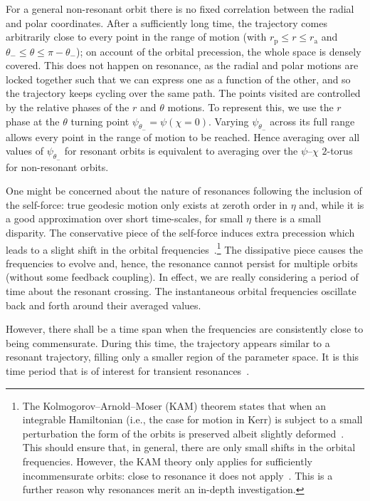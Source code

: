 \documentclass[aps,prd,amsfonts,amssymb,amsmath,nofootinbib,showpacs,superscriptaddress,twocolumn]{revtex4}
\newcommand{\sub}[1]{\ensuremath{_\text{#1}}}
\begin{document}
For a general non-resonant orbit there is no fixed correlation between the radial and polar coordinates. After a sufficiently long time, the trajectory comes arbitrarily close to every point in the range of motion (with $r\sub{p} \leq r \leq r\sub{a}$ and $\theta_- \leq \theta \leq \pi - \theta_-$); on account of the orbital precession, the whole space is densely covered. This does not happen on resonance, as the radial and polar motions are locked together such that we can express one as a function of the other, and so the trajectory keeps cycling over the same path. The points visited are controlled by the relative phases of the $r$ and $\theta$ motions. To represent this, we use the $r$ phase at the $\theta$ turning point $\psi_{\theta_-} = \psi(\chi = 0)$. Varying $\psi_{\theta_-}$ across its full range allows every point in the range of motion to be reached. Hence averaging over all values of $\psi_{\theta_-}$ for resonant orbits is equivalent to averaging over the $\psi$--$\chi$ $2$-torus for non-resonant orbits.

One might be concerned about the nature of resonances following the inclusion of the self-force: true geodesic motion only exists at zeroth order in $\eta$ and, while it is a good approximation over short time-scales, for small $\eta$ there is a small disparity. The conservative piece of the self-force induces extra precession which leads to a slight shift in the orbital frequencies~\cite{Warburton2012}.\footnote{The Kolmogorov--Arnold--Moser (KAM) theorem states that when an integrable Hamiltonian (i.e., the case for motion in Kerr) is subject to a small perturbation the form of the orbits is preserved albeit slightly deformed~\cite{Arnold1963,Moser1973}. %
This should ensure that, in general, there are only small shifts in the orbital frequencies. However, the KAM theory only applies for sufficiently incommensurate orbits: close to resonance it does not apply~\cite{Moser1973}. %
This is a further reason why resonances merit an in-depth investigation.}
The dissipative piece causes the frequencies to evolve and, hence, the resonance cannot persist for multiple orbits (without some feedback coupling). In effect, we are really considering a period of time about the resonant crossing. The instantaneous orbital frequencies oscillate back and forth around their averaged values.

However, there shall be a time span when the frequencies are consistently close to being commensurate. During this time, the trajectory appears similar to a resonant trajectory, filling only a smaller region of the parameter space. It is this time period that is of interest for transient resonances~\cite{Bosley1992}.
\end{document}
